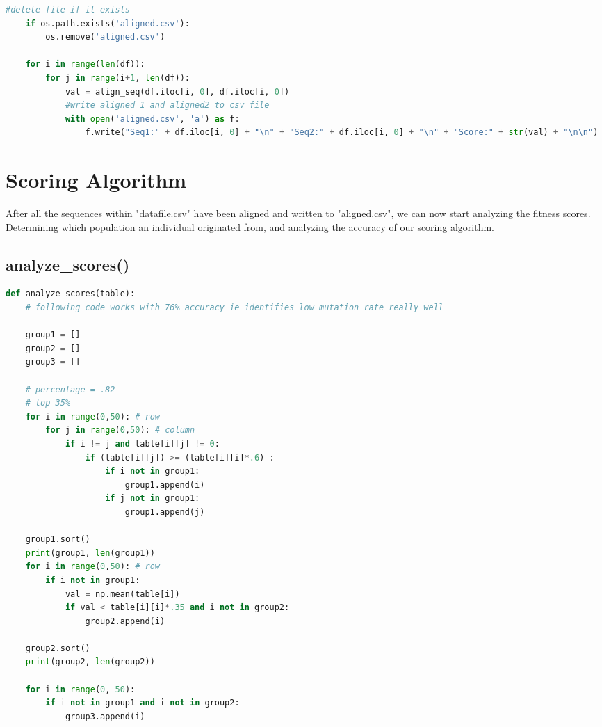 \documentclass[a4paper, 12pt, one column]{article}
\begin{document}
\begin{multicols}{2}
\begin{lstlisting}[language = python]
    #delete file if it exists
    if os.path.exists('aligned.csv'):
        os.remove('aligned.csv')

    for i in range(len(df)):
        for j in range(i+1, len(df)):
            val = align_seq(df.iloc[i, 0], df.iloc[i, 0])
            #write aligned 1 and aligned2 to csv file 
            with open('aligned.csv', 'a') as f:
                f.write("Seq1:" + df.iloc[i, 0] + "\n" + "Seq2:" + df.iloc[i, 0] + "\n" + "Score:" + str(val) + "\n\n")
\end{lstlisting}

\section{Scoring Algorithm}

\par After all the sequences within "datafile.csv" have been aligned and written to "aligned.csv", we can now start analyzing the fitness scores. Determining which population an individual originated from, and analyzing the accuracy of our scoring algorithm. 


\subsection{analyze\_scores()}

\begin{lstlisting}[language = python]
def analyze_scores(table):
    # following code works with 76% accuracy ie identifies low mutation rate really well

    group1 = []
    group2 = []
    group3 = []

    # percentage = .82
    # top 35%
    for i in range(0,50): # row
        for j in range(0,50): # column
            if i != j and table[i][j] != 0:
                if (table[i][j]) >= (table[i][i]*.6) :
                    if i not in group1:
                        group1.append(i)
                    if j not in group1:
                        group1.append(j)

    group1.sort()
    print(group1, len(group1))
    for i in range(0,50): # row
        if i not in group1:
            val = np.mean(table[i])
            if val < table[i][i]*.35 and i not in group2:
                group2.append(i)

    group2.sort()
    print(group2, len(group2))

    for i in range(0, 50):
        if i not in group1 and i not in group2:
            group3.append(i)


\end{lstlisting}
\end{multicols}
\end{document}
